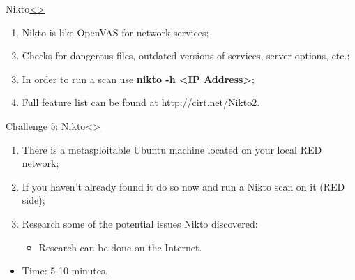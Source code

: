\documentclass[12pt]{extarticle}
\newenvironment{instructionblock}{\Large\bgroup}{\egroup}
\begin{document}

\pagebreak
\begin{slide}{Nikto\cite{b7}}{\hyperref[slide 19]{\textless}\hyperref[slide 21]{\textgreater}}
	\vskip 5pt
	\begin{instructionblock}
		\begin{enumerate}
			
			\item Nikto is like OpenVAS for network services;
			\item Checks for dangerous files, outdated versions of services, server options, etc.;
			\item In order to run a scan use \textbf{nikto -h <IP Address>};
			\item Full feature list can be found at http://cirt.net/Nikto2.
			
		\end{enumerate}
	\end{instructionblock}
\end{slide}

\pagebreak
\begin{slide}{Challenge 5: Nikto}{\hyperref[slide 20]{\textless}\hyperref[slide 22]{\textgreater}}
	\vskip 5pt
	\begin{instructionblock}
		\begin{enumerate}
			
			\item There is a metasploitable Ubuntu machine located on your local RED network;
			\item If you haven't already found it do so now and run a Nikto scan on it (RED side);
			\item Research some of the potential issues Nikto discovered:
			\begin{itemize}
				\item Research can be done on the Internet.
			\end{itemize}
			
		\end{enumerate}
	\end{instructionblock}
\end{slide}

\begin{itemize}
	\item Time: 5-10 minutes. 
\end{itemize}

\end{document}
